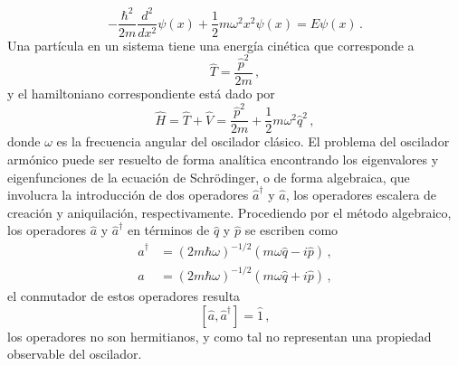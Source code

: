 \begin{equation}
  \label{OA.4}
  -\frac{\hbar^2}{2m}\frac{d^2}{dx^2}\psi(x) + \frac{1}{2}m \omega^2 x^2 \psi(x) = E \psi(x) \,.
\end{equation}
Una partícula en un sistema tiene una energía cinética que corresponde a
\begin{equation}
  \hat{T} = \frac{\hat{p}^2}{2m}\,,
\end{equation}
y el hamiltoniano correspondiente está dado por
\begin{equation}
  \hat{H} = \hat{T} + \hat{V} = \frac{\hat{p}^2}{2m} +\frac{1}{2} m\omega^2 \hat{q}^2 \label{OA.5}\,,
\end{equation}
donde $\omega$ es la frecuencia angular del oscilador clásico.
El problema del oscilador armónico puede ser resuelto de forma analítica encontrando los eigenvalores y eigenfunciones de la ecuación de Schrödinger, o de forma algebraica, que involucra la introducción de dos operadores $\hat{a}^{\dagger}$ y $\hat{a}$, los operadores escalera de creación y aniquilación, respectivamente. Procediendo por el método algebraico, los operadores $\hat{a}$ y $\hat{a}^\dagger$ en términos de $\hat{q}$ y $\hat{p}$ se escriben como
\begin{align} %
  \hat{a}^{\dagger} & = (2m\hbar\omega)^{-1/2}(m\omega \hat{q} - i\hat{p})\label{OA.6} \,,   \\
  \hat{a}           & = (2m\hbar \omega)^{-1/2}(m\omega \hat{q} + i \hat{p})\label{OA.7} \,,
\end{align}
el conmutador de estos operadores resulta
\begin{equation}
  \label{OA.8}
  [\hat{a}, \hat{a}^{\dagger}] = \hat{1} \,,
\end{equation}
los operadores no son hermitianos, y como tal no representan una propiedad observable del oscilador. %

